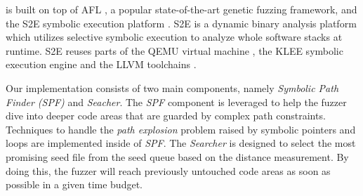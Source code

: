 \prototype is built on top of AFL \cite{online:afl}, a popular 
state-of-the-art genetic fuzzing framework, and the S2E symbolic 
execution platform \cite{chipounov2011s2e}. S2E is a dynamic 
binary analysis platform which utilizes selective symbolic execution 
to analyze whole software stacks at runtime. S2E reuses parts of 
the QEMU virtual machine \cite{bellard2005qemu}, the KLEE symbolic 
execution engine \cite{cadar2008klee} and the LLVM 
toolchains \cite{lattner2004llvm}.

Our implementation consists of two main components, namely
\emph{Symbolic Path Finder (SPF)} and \emph{Seacher}. The \emph{SPF}
component is leveraged to help the fuzzer dive into deeper code areas
that are guarded by complex path constraints. Techniques to handle the
\textit{path explosion} problem raised by symbolic pointers and loops
are implemented inside of \emph{SPF}. The \emph{Searcher} is designed
to select the most promising seed file from the seed queue based on the
distance measurement. By doing this, the fuzzer will reach previously
untouched code areas as soon as possible in a given time budget.
